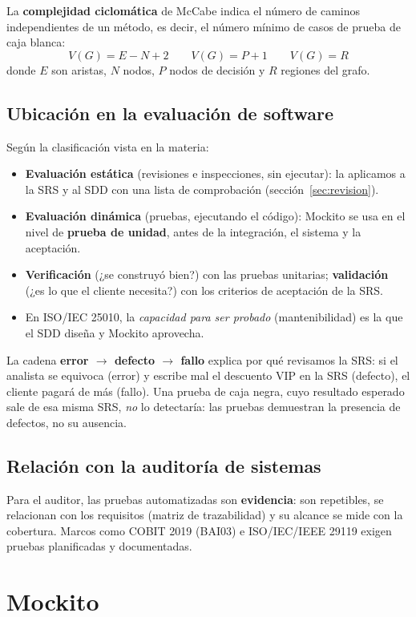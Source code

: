 \documentclass[11pt,a4paper,oneside]{report}
\begin{document}
La \textbf{complejidad ciclomática} de McCabe indica el número de caminos independientes de un método, es decir, el número mínimo de casos de prueba de caja blanca:
\[
V(G) = E - N + 2 \qquad V(G) = P + 1 \qquad V(G) = R
\]
donde $E$ son aristas, $N$ nodos, $P$ nodos de decisión y $R$ regiones del grafo.

\section{Ubicación en la evaluación de software}
Según la clasificación vista en la materia:
\begin{itemize}
  \item \textbf{Evaluación estática} (revisiones e inspecciones, sin ejecutar): la aplicamos a la SRS y al SDD con una lista de comprobación (sección~\ref{sec:revision}).
  \item \textbf{Evaluación dinámica} (pruebas, ejecutando el código): Mockito se usa en el nivel de \textbf{prueba de unidad}, antes de la integración, el sistema y la aceptación.
  \item \textbf{Verificación} (¿se construyó bien?) con las pruebas unitarias; \textbf{validación} (¿es lo que el cliente necesita?) con los criterios de aceptación de la SRS.
  \item En ISO/IEC 25010, la \emph{capacidad para ser probado} (mantenibilidad) es la que el SDD diseña y Mockito aprovecha.
\end{itemize}
La cadena \textbf{error $\rightarrow$ defecto $\rightarrow$ fallo} explica por qué revisamos la SRS: si el analista se equivoca (error) y escribe mal el descuento VIP en la SRS (defecto), el cliente pagará de más (fallo). Una prueba de caja negra, cuyo resultado esperado sale de esa misma SRS, \emph{no} lo detectaría: las pruebas demuestran la presencia de defectos, no su ausencia.

\section{Relación con la auditoría de sistemas}
Para el auditor, las pruebas automatizadas son \textbf{evidencia}: son repetibles, se relacionan con los requisitos (matriz de trazabilidad) y su alcance se mide con la cobertura. Marcos como COBIT 2019 (BAI03) e ISO/IEC/IEEE 29119 exigen pruebas planificadas y documentadas.

\chapter{Mockito}
\end{document}
